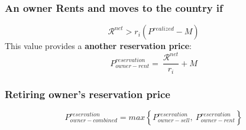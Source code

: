 \subsubsection{An owner Rents and moves to the country if} 
\[\mathcal{R}^{net}>r_i(P^{realized}-M)\]
This value provides a \textbf{another reservation price}: 
\[P_{owner-rent}^{reservation} =\ \frac{\mathcal{R}^{net}}{r_i}+M \]

\subsubsection{Retiring owner's reservation price}
\[P_{owner-combined}^{reservation}= max\left\{ P_{owner-sell}^{reservation} ,\ P_{owner-rent}^{reservation}\right\}\]


